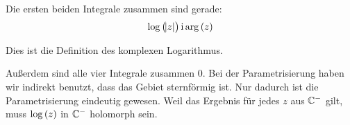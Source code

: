 Die ersten beiden Integrale zusammen sind gerade:
\[
	\log\del{\abs{z}}
	\ii \arg\del{z}
\]

Dies ist die Definition des komplexen Logarithmus.

Außerdem sind alle vier Integrale zusammen 0. Bei der Parametrisierung haben
wir indirekt benutzt, dass das Gebiet sternförmig ist. Nur dadurch ist die
Parametrisierung eindeutig gewesen. Weil das Ergebnis für jedes $z$ aus $\mathbb C^-$
gilt, muss $\log\del z$ in $\mathbb C^-$ holomorph sein.

%
%



